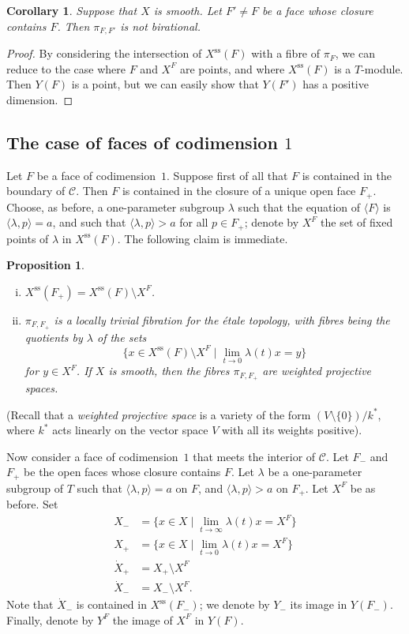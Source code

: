 \documentclass{article}
\theoremstyle{plain}
\newtheorem*{proposition}{Proposition}
\newtheorem*{corollary}{Corollary}
\theoremstyle{definition}
\renewcommand{\ss}{\mathrm{ss}}
\begin{document}
\begin{corollary}
  Suppose that $X$ is smooth.
  Let $F'\neq F$ be a face whose closure contains $F$.
  Then $\pi_{F,F'}$ is not birational.
\end{corollary}

\begin{proof}
  By considering the intersection of $X^\ss(F)$ with a fibre of $\pi_F$, we can reduce to the case where $F$ and $X^F$ are points, and where $X^\ss(F)$ is a $T$-module.
  Then $Y(F)$ is a point, but we can easily show that $Y(F')$ has a positive dimension.
\end{proof}


\subsection{The case of faces of codimension \texorpdfstring{$1$}{1}}
\label{1.5}

Let $F$ be a face of codimension~$1$.
Suppose first of all that $F$ is contained in the boundary of $\mathcal{C}$.
Then $F$ is contained in the closure of a unique open face $F_+$.
Choose, as before, a one-parameter subgroup $\lambda$ such that the equation of $\langle F\rangle$ is $\langle\lambda,p\rangle=a$, and such that $\langle\lambda,p\rangle>a$ for all $p\in F_+$;
denote by $X^F$ the set of fixed points of $\lambda$ in $X^\ss(F)$.
The following claim is immediate.

\begin{proposition}
  \begin{enumerate}[(i)]
    \item $X^\ss(F_+)=X^\ss(F)\setminus X^F$.
    \item $\pi_{F,F_+}$ is a locally trivial fibration for the \'{e}tale topology, with fibres being the quotients by $\lambda$ of the sets
      \[
        \big\{ x\in X^\ss(F)\setminus X^F \mid \lim_{t\to0}\lambda(t)x=y \big\}
      \]
      for $y\in X^F$.
      If $X$ is smooth, then the fibres $\pi_{F,F_+}$ are weighted projective spaces.
  \end{enumerate}
\end{proposition}

(Recall that a \emph{weighted projective space} is a variety of the form $(V\setminus\{0\})/k^*$, where $k^*$ acts linearly on the vector space $V$ with all its weights positive).

Now consider a face of codimension~$1$ that meets the interior of $\mathcal{C}$.
Let $F_-$ and $F_+$ be the open faces whose closure contains $F$.
Let $\lambda$ be a one-parameter subgroup of $T$ such that $\langle\lambda,p\rangle=a$ on $F$, and $\langle\lambda,p\rangle>a$ on $F_+$.
Let $X^F$ be as before.
Set
\[
  \begin{aligned}
    X_- &= \big\{x\in X\mid\lim_{t\to\infty}\lambda(t)x=X^F\big\}
  \\X_+ &= \big\{x\in X\mid\lim_{t\to0}\lambda(t)x=X^F\big\}
  \\\dot{X}_+ &= X_+\setminus X^F
  \\\dot{X}_- &= X_-\setminus X^F.
  \end{aligned}
\]
Note that $\dot{X}_-$ is contained in $X^\ss(F_-)$;
we denote by $Y_-$ its image in $Y(F_-)$.
Finally, denote by $Y^F$ the image of $X^F$ in $Y(F)$.
\end{document}
